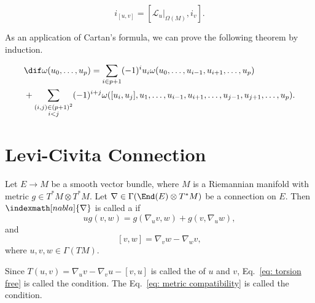 \documentclass[openany, oneside, a5paper]{book}
\begin{document}
\begin{corollary}
    \begin{equation}
        i_{[u, v]} = [\mathcal L_u |_{\Omega(M)}, i_v].
    \end{equation}
\end{corollary}

As an application of Cartan's formula, we can prove the following theorem by induction.
\begin{theorem}\label{theorem: exterior differential formula}
    {\small
        \begin{align}
        &\dif \omega(u_0, \ldots, u_p) 
            = \sum_{i \in p + 1} (-1)^i u_i \omega(u_0, \ldots, u_{i-1}, u_{i+1}, \ldots, u_p)
            \\
            &
            + \sum_{\substack{
                (i, j) \in (p + 1)^2
                \\
                i < j
                }} (-1)^ {i + j} \omega([u_i, u_j], u_1, \ldots, u_{i-1}, u_{i+1}, \ldots, u_{j-1}, u_{j+1}, \ldots, u_p).
    \end{align}
    }
\end{theorem}

\section{Levi-Civita Connection}
\begin{definition}
    Let $E \to M$ be a smooth vector bundle, where $M$ is a Riemannian manifold with metric $g \in T^*M \otimes T^*M$.
    Let $\nabla \in \Gamma(\End(E) \otimes T^*M)$ be a connection on $E$.
    Then $\indexmath[nabla]{\nabla}$ is called a  if
    \begin{equation}\label{eq: metric compatibility}
        u g(v, w) = g(\nabla_u v, w) + g(v, \nabla_u w),
    \end{equation} 
    and
    \begin{equation}\label{eq: torsion free}
        [v, w] = \nabla_v w - \nabla_w v,
    \end{equation}
    where $u, v, w \in \Gamma(TM)$.
\end{definition}

Since $T(u, v) = \nabla_u v - \nabla_v u - [v, u]$ is called the  of $u$ and $v$, 
Eq.~\eqref{eq: torsion free} is called the  condition. 
The Eq.~\eqref{eq: metric compatibility} is called the  condition.
\end{document}
